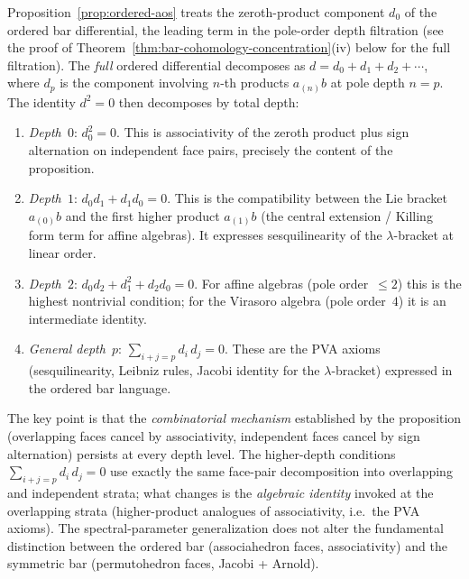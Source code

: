 \begin{remark}[Depth decomposition of $d^2=0$]
\label{rem:depth-decomposition-d-squared}
Proposition~\ref{prop:ordered-aos} treats the zeroth-product
component $d_0$ of the ordered bar differential, the leading
term in the pole-order depth filtration (see the proof of
Theorem~\ref{thm:bar-cohomology-concentration}(iv) below for the
full filtration). The \emph{full} ordered differential
decomposes as $d=d_0+d_1+d_2+\cdots$, where $d_p$ is the
component involving $n$-th products $a_{(n)}b$ at pole depth
$n=p$. The identity $d^2=0$ then decomposes by total depth:
\begin{enumerate}[label=\textup{(\roman*)}]
\item \emph{Depth~$0$}: $d_0^2=0$. This is associativity of
 the zeroth product plus sign alternation on independent face
 pairs, precisely the content of the proposition.
\item \emph{Depth~$1$}: $d_0 d_1+d_1 d_0=0$. This is
 the compatibility between the Lie bracket $a_{(0)}b$ and
 the first higher product $a_{(1)}b$ (the central extension /
 Killing form term for affine algebras). It expresses
 sesquilinearity of the $\lambda$-bracket at linear order.
\item \emph{Depth~$2$}: $d_0 d_2+d_1^2+d_2 d_0=0$.
 For affine algebras (pole order~$\le 2$) this is the
 highest nontrivial condition; for the Virasoro algebra
 (pole order~$4$) it is an intermediate identity.
\item \emph{General depth~$p$}:
 $\sum_{i+j=p}d_i\,d_j=0$.
 These are the PVA axioms (sesquilinearity, Leibniz rules,
 Jacobi identity for the $\lambda$-bracket) expressed in
 the ordered bar language.
\end{enumerate}
The key point is that the \emph{combinatorial mechanism}
established by the proposition (overlapping faces cancel by
associativity, independent faces cancel by sign
alternation) persists at every depth level. The higher-depth
conditions $\sum_{i+j=p}d_i\,d_j=0$ use exactly the same
face-pair decomposition into overlapping and independent
strata; what changes is the \emph{algebraic identity}
invoked at the overlapping strata (higher-product analogues
of associativity, i.e.\ the PVA axioms). The spectral-parameter
generalization does not alter the fundamental distinction
between the ordered bar (associahedron faces, associativity)
and the symmetric bar (permutohedron faces, Jacobi + Arnold).
\end{remark}

